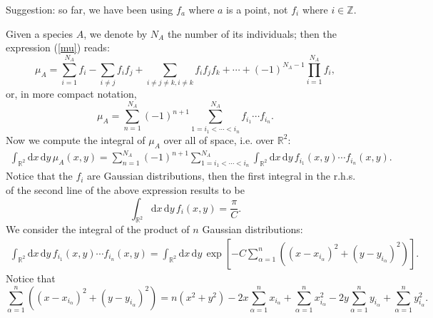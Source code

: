 \documentclass[12pt]{article}
\newcommand{\xd}{\mathrm{d}}
\numberwithin{equation}{section} %
\numberwithin{figure}{section} %
\def\ZZ{{\mathbb{Z}}}
\theoremstyle{definition}
\def\tcr#1{\textcolor{MyRed}{#1}}
\begin{document}
\tcr{Suggestion: so far, we have been using $f_a$ where $a$ is a point, not $f_i$ where $i\in\ZZ$.}

Given a species $A$, we denote by $N_A$ the number of its individuals; then the expression (\ref{mu}) reads:
\begin{equation}
\mu_A = \sum_{i=1}^{N_A} f_{i} - \sum_{i \neq j} f_{i} f_{j} + \sum_{i \neq j \neq k,  i \neq k } f_{i} f_{j} f_{k} + \cdots + (-1)^{N_A-1} \prod_{i=1}^{N_A} f_i,
\end{equation}
or, in more compact notation,
\begin{equation}
\mu_A = \sum_{n=1}^{N_A} (-1)^{n+1} \sum_{ 1=i_1< \cdots <i_n }^{N_A} f_{i_1} \cdots f_{i_n}.
\end{equation}
Now we compute the integral of $\mu_A$ over all of space, i.e. over ${\mathbb R}^2$:
\begin{align}
\int_{{\mathbb R}^2} \xd x \, \xd y \, \mu_A(x,y)
= \sum_{n=1}^{N_A} (-1)^{n+1} \sum_{ 1=i_1< \cdots <i_n }^{N_A} \int_{{\mathbb R}^2} \xd x \, \xd y \,  f_{i_1} (x,y)\cdots f_{i_n} (x,y).
\end{align}
Notice that the $f_i$ are Gaussian distributions, then the first integral in the r.h.s. of the second line of the above expression results to be
\begin{equation}
\int_{{\mathbb R}^2} \xd x \, \xd y \, f_{i}(x,y) = \frac{\pi}{C}.
\end{equation}
We consider the integral of the product of $n$ Gaussian distributions:
\begin{align}
\int_{{\mathbb R}^2} \xd x \, \xd y \,  f_{i_1} (x,y)\cdots f_{i_n} (x,y) = \int_{{\mathbb R}^2} \xd x \, \xd y \,  \exp \left[ -C \sum_{\alpha=1}^n \left( (x-x_{i_{\alpha}})^2 + (y-y_{i_{\alpha}})^2 \right) \right].
\end{align}
Notice that 
\begin{equation}
\sum_{\alpha=1}^n  \left( (x-x_{i_{\alpha}})^2 +(y-y_{i_{\alpha}})^2 \right) = n (x^2+y^2) -2x  \sum_{\alpha=1}^n x_{i_{\alpha}} + \sum_{\alpha=1}^n x_{i_{\alpha}}^2 -2y \sum_{\alpha=1}^n y_{i_{\alpha}} + \sum_{\alpha=1}^n y_{i_{\alpha}}^2.
\end{equation}
\end{document}
